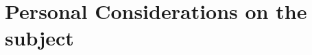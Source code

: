 \documentclass[12pt, a4paper]{article}
\begin{document}

  \pagebreak
  \section{Personal Considerations on the subject}
\end{document}
